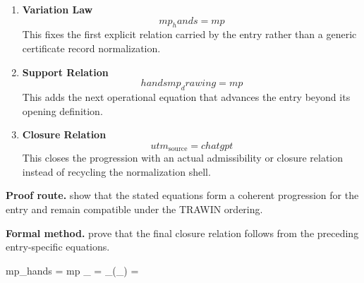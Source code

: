 \clearpage


\begin{enumerate}[leftmargin=1.6em,itemsep=9pt,topsep=6pt]
\item \textbf{Variation Law}
\[
mp_hands = mp
\]
This fixes the first explicit relation carried by the entry rather than a generic certificate record normalization.

\item \textbf{Support Relation}
\[
hands mp_drawing = mp
\]
This adds the next operational equation that advances the entry beyond its opening definition.

\item \textbf{Closure Relation}
\[
utm_{\mathrm{source}}=chatgpt
\]
This closes the progression with an actual admissibility or closure relation instead of recycling the normalization shell.
\end{enumerate}

\textbf{Proof route.} show that the stated equations form a coherent progression for the entry and remain compatible under the TRAWIN ordering.

\textbf{Formal method.} prove that the final closure relation follows from the preceding entry-specific equations.

\medskip
{}

\begin{tzpsnapshot}
\end{tzpsnapshot}

\tzpequationlinks
  {mp_hands = mp}
  {_{} = \cdots}
  {_{}\!\left(_{}\right) = \cdots}
